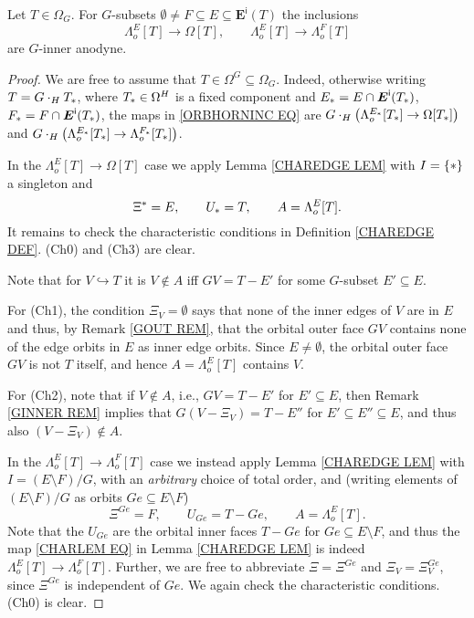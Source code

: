 \documentclass[a4paper,10pt
 ,draft
]{article}%
\begin{document}
\begin{proposition}\label{ORB_HORN_PROP}
	Let $T \in \Omega_G$.
	For $G$-subsets  
	$\emptyset \neq F \subseteq E \subseteq \boldsymbol{E}^{\mathsf{i}}(T)$
	the inclusions
\begin{equation}\label{ORBHORNINC EQ}
	\Lambda_o^{E}[T] \to \Omega[T],\qquad
	\Lambda_o^{E}[T] \to \Lambda_o^{F}[T]
\end{equation}
	are $G$-inner anodyne.
\end{proposition}

\begin{proof}
We are free to assume that $T \in \Omega^G \subseteq \Omega_G$. Indeed, otherwise writing $T = G \cdot_H T_{\**}$, where $T_{\**} \in \Omega^H$ is a fixed component and 
$E_{\**}=E \cap \boldsymbol{E}^{\mathsf{i}}(T_{\**})$, $F_{\**} = F \cap \boldsymbol{E}^{\mathsf{i}}(T_{\**})$,
the maps in \eqref{ORBHORNINC EQ} are
$G \cdot_H 
\left( \Lambda_o^{E_{\**}}[T_{\**}] \to \Omega[T_{\**}]\right)$
and
$G \cdot_H 
\left( \Lambda_o^{E_{\**}}[T_{\**}] \to \Lambda_o^{F_{\**}}[T_{\**}]\right)$.

In the $\Lambda_o^{E}[T] \to \Omega[T]$ case we apply
Lemma \ref{CHAREDGE LEM} with $I = \{\**\}$ a singleton and
\[
	\Xi^{\**} = E, \qquad 
	U_{\**} = T,\qquad
	A=\Lambda_o^{E}[T].
\]
It remains to check the characteristic conditions in Definition \ref{CHAREDGE DEF}.
(Ch0) and (Ch3) are clear.

Note that for $V\hookrightarrow T$ it is $V \not \in A$ iff 
$GV = T-E'$ for some $G$-subset
$E' \subseteq E$.

For (Ch1), the condition $\Xi_{V} = \emptyset$
says that none of the inner edges of $V$ are in $E$
and thus, by Remark \ref{GOUT REM},
that the orbital outer face $G V$ contains none of the edge orbits in $E$ as inner edge orbits. Since $E \neq \emptyset$, the orbital outer face $GV$ is not $T$ itself, 
and hence $A=\Lambda_o^{E}[T]$ contains $V$.

For (Ch2), note that if $V \not \in A$, i.e., 
$GV = T - E'$ for $E' \subseteq E$, then Remark \ref{GINNER REM} implies that
$G(V-\Xi_V) = T - E''$ for $E'\subseteq E'' \subseteq E$,
and thus also $(V-\Xi_V) \not \in A$.


In the $\Lambda_o^{E}[T] \to \Lambda_o^{F}[T]$ case 
we instead apply Lemma \ref{CHAREDGE LEM} with $I = (E \setminus F)/G$, with an 
\textit{arbitrary} choice of total order, and 
(writing elements of $(E \setminus F)/G$ as orbits $Ge \subseteq E \setminus F$)
\[
	\Xi^{Ge} = F, \qquad 
	U_{G e}= T - Ge, \qquad
	A=\Lambda_o^{E}[T].
\]
Note that the $U_{Ge}$ are the orbital inner faces $T - Ge$ for $Ge \subseteq E \setminus F$, and thus the map
\eqref{CHARLEM EQ}
in Lemma \ref{CHAREDGE LEM} is indeed $\Lambda_o^{E}[T] \to \Lambda_o^{F}[T]$.
Further, we are free to abbreviate $\Xi = \Xi^{Ge}$ and $\Xi_V = \Xi^{Ge}_V$, since
$\Xi^{Ge}$ is independent of $G e$.
We again check the characteristic conditions. (Ch0) is clear.


\end{proof}
\end{document}
